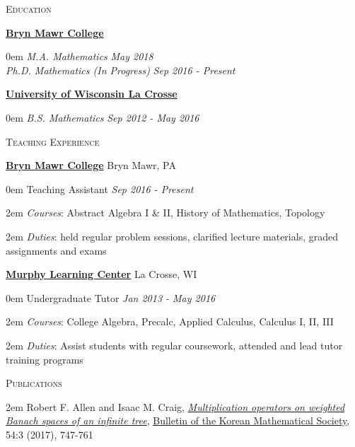 \documentclass[11pt]{article}
\newenvironment{headitem}[2]{\hspace{.5em} \textbf{#1} \hfill #2 \begin{addmargin}[0em]{0em}}{\end{addmargin}}
\renewenvironment{section}[1]{\textsc{\large #1} \vskip5pt}{\vskip10pt}
\newcommand{\itemreg}[1]{\begin{addmargin}[.75em]{2em} #1 \end{addmargin}}
\newcommand{\itemdate}[2]{\hspace{.5em} #1 \hfill \textit{#2} \\}
\newcommand{\itemitdate}[2]{\hspace{.5em} \textit{#1} \hfill \textit{#2} \\}
\begin{document}
\null
\vskip20pt



\begin{section}{Education}

	\begin{headitem}{\href{https://www.brynmawr.edu/math/}{Bryn Mawr College}}{}
		\itemitdate{M.A. Mathematics}{May 2018}
		\itemitdate{Ph.D. Mathematics (In Progress)}{Sep 2016 - Present}
	\end{headitem}
	\vskip5pt
	
	\begin{headitem}{\href{https://www.uwlax.edu/mathematics/}{University of Wisconsin La Crosse}}{}
		\itemitdate{B.S. Mathematics}{Sep 2012 - May 2016}
	\end{headitem}
	
\end{section}



\begin{section}{Teaching Experience}
	
	\begin{headitem}{\href{https://www.brynmawr.edu/math/}{Bryn Mawr College}}{Bryn Mawr, PA}
		\itemdate{Teaching Assistant}{Sep 2016 - Present}
		\itemreg{\textit{Courses}: Abstract Algebra I \& II, History of Mathematics, Topology}
		\itemreg{\textit{Duties}: held regular problem sessions, clarified lecture materials, graded assignments and exams}
	\end{headitem}
	\vskip5pt
	
	\begin{headitem}{\href{https://www.uwlax.edu/murphy-learning-center/}{Murphy Learning Center}}{La Crosse, WI}
		\itemdate{Undergraduate Tutor}{Jan 2013 - May 2016}
		\itemreg{\textit{Courses}: College Algebra, Precalc, Applied Calculus, Calculus I, II, III}
		\itemreg{\textit{Duties}: Assist students with regular coursework, attended and lead tutor training programs}
	\end{headitem}

\end{section}



\begin{section}{Publications}
	\itemreg{Robert F. Allen and Isaac M. Craig, \textit{\href{{http://bkms.kms.or.kr/journal/view.html?multi\%5B\%5D=7656\&tops=\&book=BKMS\&start=0\&scale=50\&authkey=\&keykey=\&key_1=\&titlekey=\&tit_1=\&abskey=\&abs_1=\&msckey=\&msc_1=\&Vol=54\&Num=3\&PG=\&year1=\&year2=\&sort=Regnum-0\&aut_box=Y\&sub_box=Y\&sos_box=\&key_box=\&pub_box=Y\&abs_box=\&mod=vol\&sflag=\&language=\&uid=}}{Multiplication operators on weighted Banach spaces of an infinite tree}}, \href{http://bkms.kms.or.kr/}{Bulletin of the Korean Mathematical Society}, 54:3 (2017), 747-761}
\end{section}
\end{document}
